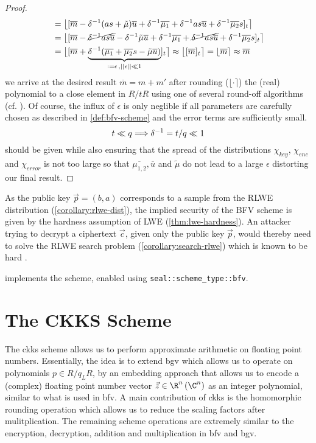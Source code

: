 \begin{proof}
\begin{align*}
     & = \big\lfloor [\overline{m} - \delta^{-1} (as + \tilde{\mu}) \overline{u} + \delta^{-1} \overline{\mu_1} + \delta^{-1} a s \overline{u} + \delta^{-1} \overline{\mu_2} s]_t \big\rceil                                        \\
     & = \big\lfloor [\overline{m} - \cancel{\delta^{-1} as \overline{u}} - \delta^{-1} \tilde{\mu} \overline{u} + \delta^{-1} \overline{\mu_1} + \cancel{\delta^{-1} as \overline{u}} + \delta^{-1} \overline{\mu_2} s]_t \big\rceil \\
     & = \big\lfloor [\overline{m} + \underbrace{\delta^{-1} (\overline{\mu_1} + \overline{\mu_2} s - \tilde{\mu} \overline{u})}_{:= \epsilon \,, ||\epsilon|| \ll 1}]_t \big\rceil
    \approx \big\lfloor [\overline{m}]_t \big\rceil = \lfloor \overline{m} \rceil \approx \overline{m}
  \end{align*}
  we arrive at the desired result $\overline{m} = m + m'$ after rounding ($\lfloor \cdot \rceil$) the (real) polynomial to a close element in $R/tR$ using one of several round-off algorithms  (cf. \cite{2013-rlwe-toolkit}).
  Of course, the influx of $\epsilon$ is only neglible if all parameters are carefully chosen as described in \cref{def:bfv-scheme} and the error terms are sufficiently small.
  $$t \ll q \Longrightarrow \delta^{-1} = t/q \ll 1$$ should be given while also ensuring that the spread of the distributions $\chi_{key}$, $\chi_{enc}$ and $\chi_{error}$ is not too large so that $\overline{\mu_{1,2}}, \overline{u}$ and $\tilde{\mu}$ do not lead to a large $\epsilon$ distorting our final result.
\end{proof}

As the public key $\vec{p} = (b, a)$ corresponds to a sample from the RLWE distribution (\cref{corollary:rlwe-dist}), the implied security of the BFV scheme is given by the hardness assumption of LWE (\cref{thm:lwe-hardness}).
An attacker trying to decrypt a ciphertext $\vec{c}$, given only the public key $\vec{p}$, would thereby need to solve the RLWE search problem (\cref{corollary:search-rlwe}) which is known to be hard \parencite{2010-rlwe-original}.

\cite{seal-4.0} implements the scheme, enabled using \texttt{seal::scheme\_type::bfv}.

\pagebreak
\section{The CKKS Scheme}
\label{sec:ckks}
The \gls{ckks} scheme allows us to perform approximate arithmetic on floating point numbers.
Essentially, the idea is to extend \gls{bgv} which allows us to operate on polynomials $p \in R/q_L R$, by an embedding approach that allows us to encode a (complex) floating point number vector $\vec{z} \in \R^n\, (\C^n)$ as an integer polynomial, similar to what is used in \gls{bfv}.
A main contribution of \gls{ckks} is the homomorphic rounding operation which allows us to reduce the scaling factors after mulitplication.
The remaining scheme operations are extremely similar to the encryption, decryption, addition and multiplication in \gls{bfv} and \gls{bgv}.

